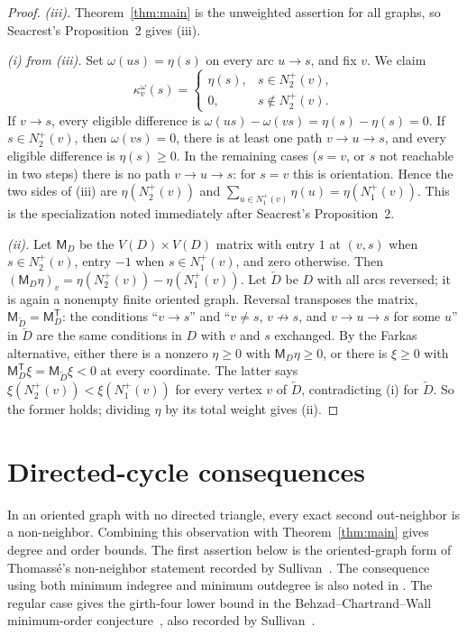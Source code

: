 \documentclass[11pt]{article}
\theoremstyle{remark}
\begin{document}
\begin{proof}
\emph{\textup{(iii)}.}  Theorem~\ref{thm:main} is the unweighted assertion
for all graphs, so Seacrest's Proposition~2 gives \textup{(iii)}.

\emph{\textup{(i)} from \textup{(iii)}.}  Set $\omega(us)=\eta(s)$ on every
arc $u\to s$, and fix $v$.  We claim
\[
 \kappa_v^\omega(s)=
 \begin{cases}
  \eta(s),&s\in N_2^+(v),\\
  0,&s\notin N_2^+(v).
 \end{cases}
\]
If $v\to s$, every eligible difference is
$\omega(us)-\omega(vs)=\eta(s)-\eta(s)=0$.  If $s\in N_2^+(v)$, then
$\omega(vs)=0$, there is at least one path $v\to u\to s$, and every
eligible difference is $\eta(s)\ge0$.  In the remaining cases ($s=v$, or
$s$ not reachable in two steps) there is no path $v\to u\to s$: for $s=v$
this is orientation.  Hence the two sides of \textup{(iii)} are
$\eta(N_2^+(v))$ and $\sum_{u\in N_1^+(v)}\eta(u)=\eta(N_1^+(v))$.
This is the specialization noted immediately after Seacrest's
Proposition~2.

\emph{\textup{(ii)}.}  Let $\mathsf M_D$ be the $V(D)\times V(D)$ matrix
with entry $1$ at $(v,s)$ when $s\in N_2^+(v)$, entry $-1$ when
$s\in N_1^+(v)$, and zero otherwise.  Then $(\mathsf M_D\eta)_v
=\eta(N_2^+(v))-\eta(N_1^+(v))$.  Let $\overleftarrow D$ be $D$ with all
arcs reversed; it is again a nonempty finite oriented graph.
Reversal transposes the matrix,
$\mathsf M_{\overleftarrow D}=\mathsf M_D^{\mathsf T}$: the conditions
``$v\to s$'' and ``$v\ne s$, $v\not\to s$, and $v\to u\to s$ for some $u$''
in $\overleftarrow D$ are the same conditions in $D$ with $v$ and $s$
exchanged.
By the Farkas alternative, either there is a nonzero $\eta\ge0$ with
$\mathsf M_D\eta\ge0$, or there is $\xi\ge0$ with
$\mathsf M_D^{\mathsf T}\xi=\mathsf M_{\overleftarrow D}\xi<0$ at every
coordinate.  The latter says $\xi(N_2^+(v))<\xi(N_1^+(v))$ for every vertex
$v$ of $\overleftarrow D$, contradicting \textup{(i)} for
$\overleftarrow D$.  So the former holds; dividing $\eta$ by its total
weight gives \textup{(ii)}.
\end{proof}

\section{Directed-cycle consequences}\label{sec:directed-cycle-consequences}

In an oriented graph with no directed triangle, every exact second
out-neighbor is a non-neighbor.  Combining this observation with
Theorem~\ref{thm:main} gives degree and order bounds.
The first assertion below is the oriented-graph form of Thomass\'e's
non-neighbor statement recorded by
Sullivan~\cite[Conjecture~6.12]{Sullivan2006}.
The consequence using both minimum indegree and minimum outdegree is also
noted in \cite[Section~3]{Sullivan2006}.  The regular case gives the
girth-four lower bound in the Behzad--Chartrand--Wall minimum-order
conjecture~\cite{BehzadChartrandWall1970}, also recorded by
Sullivan~\cite[Section~4]{Sullivan2006}.
\end{document}
